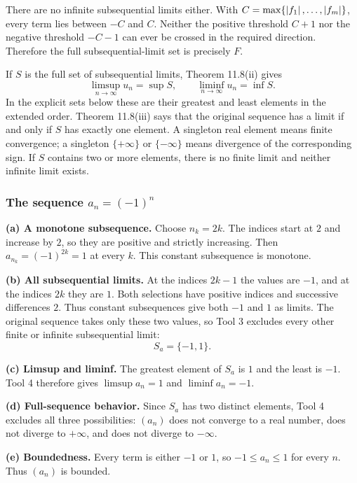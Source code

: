 There are no infinite subsequential limits either. With
$C=\max\{\left|f_1\right|,\ldots,\left|f_m\right|\}$, every term lies
between $-C$ and $C$. Neither the positive threshold $C+1$
nor the negative threshold $-C-1$ can ever be crossed in
the required direction. Therefore the full subsequential-limit
set is precisely $F$.

If $S$ is the full set of subsequential limits, Theorem 11.8(ii)
gives
\[
 \limsup_{n\to\infty}u_n=\sup S,
 \qquad
 \liminf_{n\to\infty}u_n=\inf S.
\]
In the explicit sets below these are their greatest and least
elements in the extended order. Theorem 11.8(iii) says that
the original sequence has a limit if and only if $S$ has
exactly one element. A singleton real element means finite
convergence; a singleton $\{+\infty\}$ or $\{-\infty\}$
means divergence of the corresponding sign. If $S$ contains
two or more elements, there is no finite limit and neither
infinite limit exists.

\subsubsection*{The sequence $a_n=(-1)^n$}

\textbf{(a) A monotone subsequence.}
Choose $n_k=2k$. The indices start at $2$ and increase by $2$,
so they are positive and strictly increasing. Then
$a_{n_k}=(-1)^{2k}=1$ at every $k$. This constant
subsequence is monotone.

\textbf{(b) All subsequential limits.}
At the indices $2k-1$ the values are $-1$, and at the
indices $2k$ they are $1$. Both selections have positive
indices and successive differences $2$. Thus constant
subsequences give both $-1$ and $1$ as limits.
The original sequence takes only these two values, so Tool 3
excludes every other finite or infinite subsequential limit:
\[
 S_a=\{-1,1\}.
\]

\textbf{(c) Limsup and liminf.}
The greatest element of $S_a$ is $1$ and the least is $-1$.
Tool 4 therefore gives $\limsup a_n=1$ and $\liminf a_n=-1$.

\textbf{(d) Full-sequence behavior.}
Since $S_a$ has two distinct elements, Tool 4 excludes all
three possibilities: $(a_n)$ does not converge to a real
number, does not diverge to $+\infty$, and does not diverge
to $-\infty$.

\textbf{(e) Boundedness.}
Every term is either $-1$ or $1$, so
$-1\leq a_n\leq1$ for every $n$. Thus $(a_n)$ is bounded.

